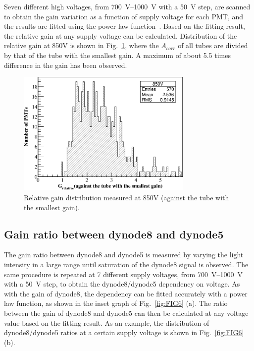 \documentclass{nst}
\begin{document}
Seven different high voltages, from \SIrange{700}{1000}{\volt} with a \SI{50}{\volt} step, are scanned to obtain the gain variation as a function of supply voltage for each PMT, and the results are fitted using the power law function~\cite{hamamatsu}.
Based on the fitting result, the relative gain at any supply voltage can be calculated.
Distribution of the relative gain at 850V is shown in Fig.~\ref{fig:FIG5}, where the $A_{corr}$ of all tubes are divided by that of the tube with the smallest gain. 
A maximum of about 5.5 times difference in the gain has been observed.

\begin{figure}[!htb]
	\centering
	\includegraphics[width=85mm]{FIG5}
	\caption{Relative gain distribution measured at 850V (against the tube with the smallest gain).}
	\label{fig:FIG5}
\end{figure}

\subsection{Gain ratio between dynode8 and dynode5}
\label{sec:psd_dy58}

The gain ratio between dynode8 and dynode5 is measured by varying the light intensity in a large range until saturation of the dynode8 signal is observed.
The same procedure is repeated at 7 different supply voltages, from \SIrange{700}{1000}{\volt} with a \SI{50}{\volt} step, to obtain the dynode8/dynode5 dependency on voltage.
As with the gain of dynode8, the dependency can be fitted accurately with a power law function, as shown in the inset graph of Fig.~\ref{fig:FIG6} (a).
The ratio between the gain of dynode8 and dynode5 can then be calculated at any voltage value based on the fitting result.
As an example, the distribution of dynode8/dynode5 ratios at a certain supply voltage is shown in Fig.~\ref{fig:FIG6} (b).
\end{document}
